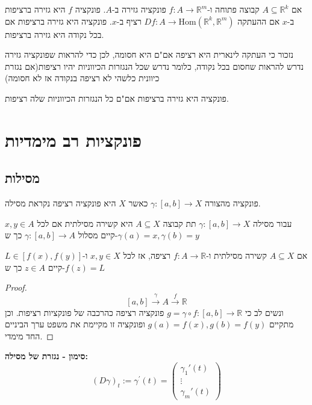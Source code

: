 \documentclass{tstextbook}
\begin{document}
\begin{definition}
אם \(A\subseteq \mathbb{R}^k\) קבוצה פתוחה ו-\(f:A\to\mathbb{R}^m\) פונקציה גזירה ב-\(A\). פונקציה \(f\) היא גזירה ברציפות ב-\(x\) אם ההעתקה \(Df:A\to \mathrm{Hom}\left( \mathbb{R}^k,\mathbb{R}^m \right)\) רציף ב-\(x\). פונקציה היא גזירה ברציפות אם בכל נקודה היא גזירה ברציפות.

\end{definition}
נזכור כי העתקה לינארית היא רציפה אם"ם היא חסומה, לכן כדי להראות שפונקציה גזירה נדרש להראות שחסום בכל נקודה, כלומר נדרש שכל הנגזרות הכיווניות יהיו רציפות(אם נגזרת כיוונית כלשהי לא רציפה בנקודה אז לא חסומה)

\begin{corollary}
פונקציה היא גזירה ברציפות אם"ם כל הנגזרות הכיווניות שלה רציפות.

\end{corollary}
\section{פונקציות רב מימדיות}

\subsection{מסילות}

\begin{definition}[מסילה]
פונקציה מהצורה \(\gamma:[a,b]\to X\) כאשר \(X\) היא פונקציה רציפה נקראת מסילה.

\end{definition}
\begin{definition}
עבור מסילה \(\gamma:[a,b]\to X\) תת קבוצה \(A\subseteq X\) היא קשירה מסילתית אם לכל \(x,y\in A\) קיים מסלול \(\gamma:[a,b]\to A\) כך ש-\(\gamma(a)=x,\gamma(b)=y\)

\end{definition}
\begin{theorem}
אם \(A\subseteq X\) קשירה מסילתית ו-\(f:A\to\mathbb{R}\) רציפה, אז לכל \(x,y\in X\) ו-\(L\in[f(x),f(y)]\) קיים \(z\in A\) כך ש-\(f(z)=L\)

\end{theorem}
\begin{proof}
$$[a,b]\xrightarrow{\gamma}A\xrightarrow{f}\mathbb{R}$$
ונשים לב כי \(g=\gamma \circ f:[a,b]\to\mathbb{R}\) פונקציה רציפה כהרכבה של פונקציות רציפות. וכן מתקיים \(g(a)=f(x),g(b)=f(y)\) ופונקציה זו מקיימת את משפט ערך הביניים החד מימדי.

\end{proof}
\textbf{סימון - נגזרת של מסילה:}$$\left( D\gamma \right)_{t}:=\gamma^{\prime}(t)=\begin{pmatrix}\gamma_{1}'(t) \\\vdots \\\gamma_{m}'(t)
\end{pmatrix}$$
\end{document}
